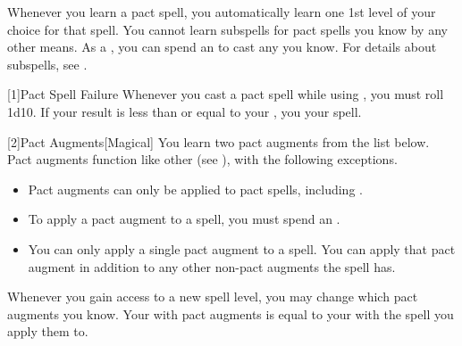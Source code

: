         Whenever you learn a pact spell, you automatically learn one 1st level  of your choice for that spell.
        You cannot learn subspells for pact spells you know by any other means.
        As a , you can spend an  to cast any  you know.
        For details about subspells, see .

        [1]{Pact Spell Failure}
        Whenever you cast a pact spell while using , you must roll 1d10.
        If your result is less than or equal to your , you  your spell.

        [2]{Pact Augments}[Magical] You learn two pact augments from the list below.
        Pact augments function like other  (see ), with the following exceptions.
        \begin{itemize}
            \item Pact augments can only be applied to pact spells, including .
            \item To apply a pact augment to a spell, you must spend an .
            \item You can only apply a single pact augment to a spell.
                You can apply that pact augment in addition to any other non-pact augments the spell has.
        \end{itemize}
        Whenever you gain access to a new spell level, you may change which pact augments you know.
        Your  with pact augments is equal to your  with the spell you apply them to.
